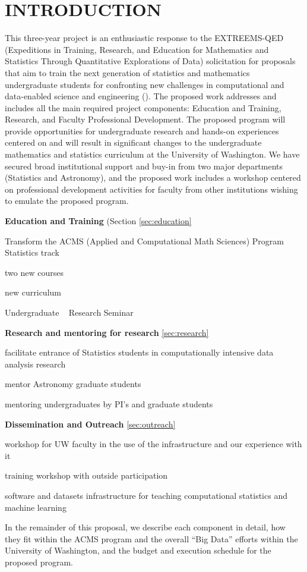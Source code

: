 \section{ INTRODUCTION}

This three-year project is an enthusiastic response to the EXTREEMS-QED (Expeditions in Training, Research, 
and Education for Mathematics and Statistics Through Quantitative Explorations of Data) solicitation for proposals
that aim to train the next generation of statistics and mathematics undergraduate students for confronting new
challenges in computational and data-enabled science and engineering (\cdse).  The proposed work addresses and 
includes all the main required project components: Education and Training, Research, and Faculty Professional 
Development. The proposed program will provide opportunities for undergraduate research and hands-on experiences 
centered on \cdse and will result in significant changes to the undergraduate mathematics and statistics curriculum 
at the University of Washington. We have secured broad institutional support and buy-in from two major departments 
(Statistics and Astronomy), and the proposed work includes a workshop centered on professional development activities
for faculty from other institutions wishing to emulate the proposed program. 

\bits
\item[]{\bf Education and Training} (Section \ref{sec:education} 
\item Transform the ACMS (Applied and Computational Math Sciences) Program Statistics track
  \bits
  \item two new courses
  \item new curriculum 
  \item Undergraduate \cdse~ Research Seminar
  \eits
\item {\bf Research and mentoring for research} \ref{sec:research} 
  \bits
  \item facilitate entrance of Statistics students in computationally intensive data analysis research
  \item mentor Astronomy graduate students 
  \item mentoring undergraduates by PI's and graduate students
  \eits
\item {\bf Dissemination and Outreach} \ref{sec:outreach}
  \bits
  \item workshop for UW faculty in the use of the infrastructure and our experience with it
  \item training workshop with outside participation 
  \item software and datasets infrastructure for teaching computational statistics and machine learning 
  \eits
\eits  


In the remainder of this proposal, we describe each component in
detail, how they fit within the ACMS program and the overall ``Big
Data'' efforts within the University of Washington, and the budget and
execution schedule for the proposed program.


